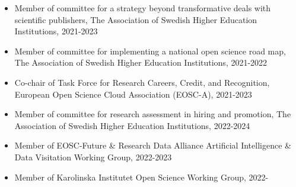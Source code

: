 \documentclass[10pt]{article}
\begin{document}
\begin{itemize}[nolistsep]
\item Member of committee for a strategy beyond transformative deals with scientific publishers, The Association of Swedish Higher Education Institutions, 2021-2023
\item Member of committee for implementing a national open science road map, The Association of Swedish Higher Education Institutions, 2021-2022
\item Co-chair of Task Force for Research Careers, Credit, and Recognition, European Open Science Cloud Association (EOSC-A), 2021-2023
\item Member of committee for research assessment in hiring and promotion, The Association of Swedish Higher Education Institutions, 2022-2024
\item Member of EOSC-Future \& Research Data Alliance Artificial Intelligence \& Data Visitation Working Group, 2022-2023
\item Member of Karolinska Institutet Open Science Working Group, 2022-


\end{itemize}
\end{document}
